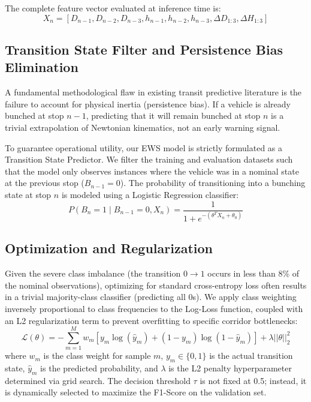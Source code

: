 \documentclass[journal,twocolumn]{IEEEtran}
\begin{document}
The complete feature vector evaluated at inference time is:
\begin{equation}
	X_n = \left[ D_{n-1}, D_{n-2}, D_{n-3}, h_{n-1}, h_{n-2}, h_{n-3}, \Delta D_{1:3}, \Delta H_{1:3} \right]
\end{equation}

\subsection{Transition State Filter and Persistence Bias Elimination}
A fundamental methodological flaw in existing transit predictive literature is the failure to account for physical inertia (persistence bias). If a vehicle is already bunched at stop $n-1$, predicting that it will remain bunched at stop $n$ is a trivial extrapolation of Newtonian kinematics, not an early warning signal.

To guarantee operational utility, our EWS model is strictly formulated as a Transition State Predictor. We filter the training and evaluation datasets such that the model only observes instances where the vehicle was in a nominal state at the previous stop ($B_{n-1} = 0$). The probability of transitioning into a bunching state at stop $n$ is modeled using a Logistic Regression classifier:
\begin{equation}
	P(B_n=1 \mid B_{n-1}=0, X_n) = \frac{1}{1 + e^{-(\theta^T X_n + \theta_0)}}
\end{equation}

\subsection{Optimization and Regularization}
Given the severe class imbalance (the transition $0 \rightarrow 1$ occurs in less than 8\% of the nominal observations), optimizing for standard cross-entropy loss often results in a trivial majority-class classifier (predicting all 0s). We apply class weighting inversely proportional to class frequencies to the Log-Loss function, coupled with an L2 regularization term to prevent overfitting to specific corridor bottlenecks:
\begin{equation}
	\mathcal{L}(\theta) = - \sum_{m=1}^{M} w_m \left[ y_m \log(\hat{y}_m) + (1-y_m)\log(1-\hat{y}_m) \right] + \lambda ||\theta||_2^2
\end{equation}
where $w_m$ is the class weight for sample $m$, $y_m \in \{0, 1\}$ is the actual transition state, $\hat{y}_m$ is the predicted probability, and $\lambda$ is the L2 penalty hyperparameter determined via grid search. The decision threshold $\tau$ is not fixed at 0.5; instead, it is dynamically selected to maximize the F1-Score on the validation set.
\end{document}
